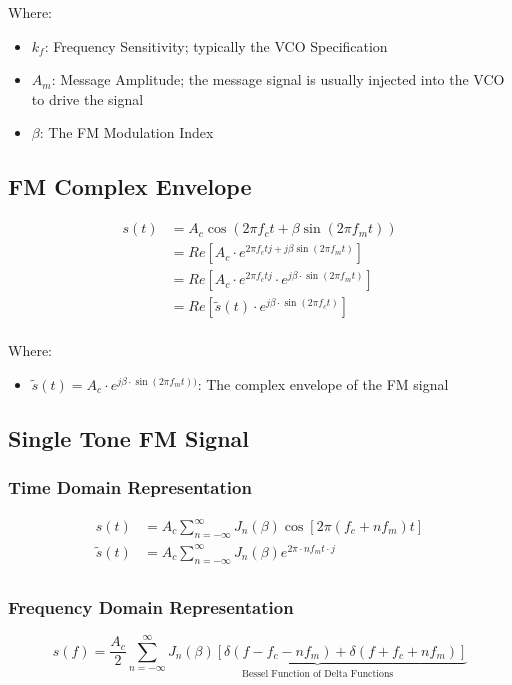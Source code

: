 \documentclass[10pt]{article}
\begin{document}
\noindent Where:
\begin{itemize}
	\item $k_f$: Frequency Sensitivity; typically the VCO Specification
	\item $A_m$: Message Amplitude; the message signal is usually injected into the VCO to drive the signal
	\item $\beta$: The FM Modulation Index
\end{itemize}

\subsection{FM Complex Envelope}
\begin{align*}
	s(t) & = A_c \cos(2\pi f_c t + \beta \sin(2 \pi f_m t))                                 \\
	     & = Re\left[A_c \cdot e^{2\pi f_c tj + j\beta\sin(2\pi f_m t)}\right]              \\
	     & = Re\left[A_c \cdot e^{2\pi f_c tj} \cdot e^{j\beta\cdot\sin(2\pi f_m t)}\right] \\
	     & = Re\left[\tilde{s}(t)\cdot e^{j\beta\cdot\sin(2\pi f_c t)}\right]               \\
\end{align*}

\noindent Where:
\begin{itemize}
	\item $\tilde{s}(t) = A_c \cdot e^{j \beta\cdot\sin(2\pi f_m t))}$: The complex envelope of the FM signal
\end{itemize}

\subsection{Single Tone FM Signal}
\subsubsection{Time Domain Representation}
\begin{align*}
	s(t)         & = A_c \sum_{n=-\infty}^{\infty}  J_n(\beta)\cos\left[2 \pi (f_c + n f_m) t\right] \\
	\tilde{s}(t) & = A_c \sum_{n=-\infty}^{\infty} J_n(\beta) e^{2 \pi \cdot n f_m t \cdot j}        \\
\end{align*}
\subsubsection{Frequency Domain Representation}
\[
	s(f) = \frac{A_c}{2} \sum_{n=-\infty}^{\infty} \underbrace{J_n(\beta)\left[\delta(f-f_c-n f_m) + \delta(f+f_c+n f_m)\right]}_{\text{Bessel Function of Delta Functions}}
\]
\end{document}
